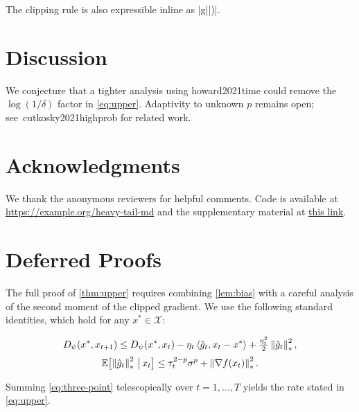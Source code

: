 The clipping rule is also expressible inline as |g||)|.

\section{Discussion}\label{sec:disc}

We conjecture that a tighter analysis using \cite{}howard2021time could remove the $\log(1/\delta)$ factor in \eqref{eq:upper}. Adaptivity to unknown $p$ remains open; see~\cite{}cutkosky2021highprob for related work.

\section*{Acknowledgments}

We thank the anonymous reviewers for helpful comments. Code is available at \href{https://example.org/heavy-tail-md}{https://example.org/heavy-tail-md} and the supplementary material at \href{https://example.org/heavy-tail-md-supp}{this link}.

\appendix

\section{Deferred Proofs}\label{app:proofs}

The full proof of \cref{thm:upper} requires combining \cref{lem:bias} with a careful analysis of the second moment of the clipped gradient. We use the following standard identities, which hold for any $x^{*} \in \mathcal{X}$:

\begin{gather}D_{\psi}(x^{*}, x_{t+1}) \leq D_{\psi}(x^{*}, x_{t}) - \eta_{t} \left\langle\hat g_t,x_t - x^*\right\rangle+ \tfrac{\eta_t^2}{2}\left\lVert\hat g_t\right\rVert_{*}^{2}, \label{eq:three-point}\\[2pt] \mathbb{E}\bigl[\left\lVert\hat g_t\right\rVert_{*}^{2} \,\big|\, x_{t}\bigr] \leq \tau_{t}^{2-p}\sigma^{p} + \left\lVert\nabla f(x_t)\right\rVert_{*}^{2}. \label{eq:second-moment}\end{gather}

Summing \eqref{eq:three-point} telescopically over $t = 1, \ldots, T$ yields the rate stated in \eqref{eq:upper}.

